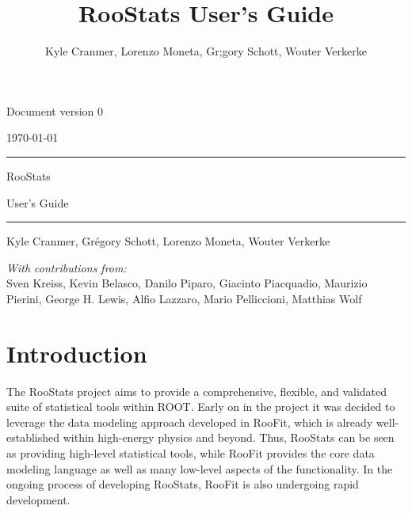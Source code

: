 \documentclass[11pt]{article}
\title{RooStats User's Guide}
\author{Kyle Cranmer, Lorenzo Moneta, Gr\eacute;gory Schott, Wouter Verkerke}
\begin{document}
\sf

{\flushright 
Document version 0 

\flushright 
\today

}

\vspace{2in}

\hrule
\vspace{.1in}
{\huge RooStats}
\vspace{.5in}

{\huge User's Guide}
\vspace{.1in}
\hrule

\vspace{.5in}

{\large Kyle Cranmer, Gr\'egory Schott, Lorenzo Moneta, Wouter Verkerke}

\vspace{2in}
{\em With contributions from:}\\

Sven Kreiss, Kevin Belasco, Danilo Piparo, Giacinto Piacquadio, Maurizio Pierini, George H. Lewis, Alfio Lazzaro, Mario Pelliccioni, Matthias Wolf


\newpage
\tableofcontents 





\newpage
\section{Introduction}

The RooStats project aims to provide a comprehensive, flexible, and validated suite of statistical tools within ROOT.  Early on in the project it was decided to leverage the data modeling approach developed in RooFit, which is already well-established within high-energy physics and beyond.  Thus, RooStats can be seen as providing high-level statistical tools, while RooFit provides the core data modeling language as well as many low-level aspects of the functionality.   In the ongoing process of developing RooStats, RooFit is also undergoing rapid development.
\end{document}
